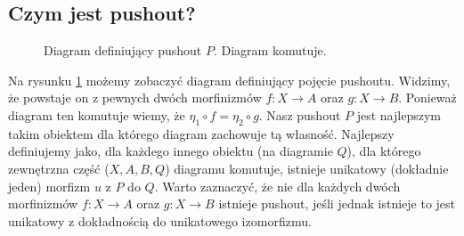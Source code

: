 \subsection{Czym jest pushout?}
\begin{figure}[!htp]
    \centering
    \caption{Diagram definiujący pushout $P$. Diagram komutuje.}
    \label{fig:pushout_def}
\end{figure}
Na rysunku \ref{fig:pushout_def} możemy zobaczyć diagram definiujący pojęcie pushoutu. Widzimy, że powstaje on z pewnych dwóch morfinizmów $f:X \rightarrow A$ oraz $g:X \rightarrow B$. Ponieważ diagram ten komutuje wiemy, że $\eta_1 \circ f = \eta_2 \circ g$. Nasz pushout $P$ jest najlepszym takim obiektem dla którego diagram zachowuje tą własność. Najlepszy definiujemy jako, dla każdego innego obiektu (na diagramie $Q$), dla którego zewnętrzna część ($X, A, B, Q$) diagramu komutuje, istnieje unikatowy (dokładnie jeden) morfizm $u$ z $P$ do $Q$. Warto zaznaczyć, że nie dla każdych dwóch morfinizmów $f:X \rightarrow A$ oraz $g:X \rightarrow B$ istnieje pushout, jeśli jednak istnieje to jest unikatowy z dokładnością do unikatowego izomorfizmu.
